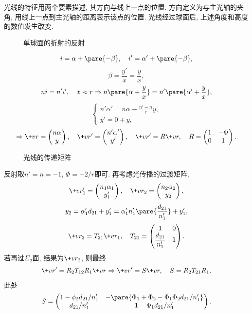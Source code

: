\documentclass{ctexart}
\begin{document}
光线的特征用两个要素描述, 其方向与线上一点的位置. 方向定义为与主光轴的夹角, 用线上一点到主光轴的距离表示该点的位置. 光线经过球面后, 上述角度和高度的数值发生改变.\\
\begin{figure}[ht]
    \centering
    \caption{单球面的折射的反射}
\end{figure}
\[ i = \alpha + \pare{-\beta},\quad i' = \alpha' + \pare{-\beta}, \]
\[ \beta = \frac{y'}{x} = \frac{y}{x}, \]
\[ ni = n'i',\quad x\approx r\Rightarrow n\pare{\alpha + \frac{y}{x}} = n'\pare{\alpha' + \frac{y}{x}}, \]
\[ \begin{cases}
    n'\alpha' = n\alpha - \frac{n'-n}{r}y,\\
    y' = 0+y,
\end{cases} \]
\[ \Rightarrow \+vr = \begin{pmatrix}
    n\alpha\\
    y
\end{pmatrix}, \quad \+vr' = \begin{pmatrix}
    n'\alpha'\\
    y'
\end{pmatrix}, \quad \+vr' = R\+vr,\quad  R = \begin{pmatrix}
    1 & -\Phi \\
    0 & 1
\end{pmatrix}. \]
\begin{figure}[ht]
    \centering
    \caption{光线的传递矩阵}
\end{figure}
反射取$n'=n=-1$, $\Phi = -2/r$即可. 再考虑光传播的过渡矩阵,
\[ \+vr'_1 = \begin{pmatrix}
    n_1\alpha_1\\
    y'_1
\end{pmatrix},\quad \+vr_2 = \begin{pmatrix}
    n_2\alpha_2 \\
    y_2
\end{pmatrix}, \]
\[ y_2 = \alpha'_1 d_{21} + y'_1 = \alpha'_1n'_1\pare{\frac{d_{21}}{n'_1}} + y'_1, \]
\[ \+vr_2 = T_{21}\+vr_1,\quad T_{21} = \begin{pmatrix}
    1 & 0 \\
    \displaystyle\frac{d_{21}}{n'_1} & 1
\end{pmatrix}. \]
若再过$\Sigma_2$面, 结果为$\+vr_2$, 则最终
\[ \+vr' = R_2 T_{12} R_1 \+vr\Rightarrow \+vr' = S\+vr,\quad S = R_2 T_{21}R_1. \]
此处
\[ S = \begin{pmatrix}
    1 - \phi_2 d_{21}/n'_1 & -\pare{\Phi_1 + \Phi_2 - \Phi_1\Phi_2 d_{21}/n'_1} \\
    d_{21}/n'_1 & 1 - \Phi_1 d_{21}/n'_1
\end{pmatrix}. \]
\end{document}
